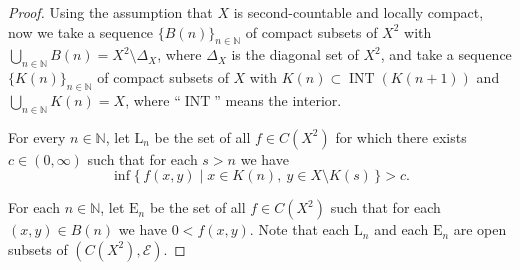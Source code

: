 \documentclass[10pt,a4paper]{amsart}
\DeclareMathOperator{\nai}{INT}
\newcommand{\nn}{\mathbb{N}}
\newcommand{\yodset}[1]{B(#1)}
\newcommand{\yoeset}[1]{\mathrm{E}_{#1}}
\newcommand{\yokset}[1]{K(#1)}
\newcommand{\yolset}[1]{\mathrm{L}_{#1}}
\begin{document}
\begin{proof}
Using the assumption that 
$X$ 
is second-countable and  locally compact, 
now  we take a sequence 
$\{\yodset{n}\}_{n\in \nn}$ 
of compact subsets of 
$X^{2}$ 
with 
$\bigcup_{n\in \nn}\yodset{n}=X^{2}\setminus \Delta_{X}$, 
where 
$\Delta_{X}$ 
is the diagonal set of 
$X^{2}$, 
and take a sequence 
$\{\yokset{n}\}_{n\in \nn}$ 
of compact subsets of 
$X$ 
with 
$\yokset{n}\subset \nai(\yokset{n+1})$ 
and 
$\bigcup_{n\in \nn} \yokset{n}=X$, 
where 
``$\nai$''
means the interior. 


For every 
$n\in \nn$,  
let
 $\yolset{n}$ 
be the set of all 
$f\in C(X^{2})$ 
for which 
there exists
$c\in (0, \infty)$ 
such that 
for each  
$s>n$ 
we have 
\[
\inf\{\, f(x, y)\mid x\in \yokset{n}, \  y\in X\setminus \yokset{s}\, \} >c. 
\]

For each 
$n\in \nn$,  
let 
$\yoeset{n}$ 
be 
the set of all 
$f\in C(X^{2})$ 
such that
for each 
$(x, y)\in \yodset{n}$ 
we have 
$0<f(x, y)$.  
Note that each 
$\yolset{n}$ 
and each 
$\yoeset{n}$ 
are open subsets 
of 
$(C(X^{2}), \mathcal{E})$. 


\end{proof}
\end{document}
